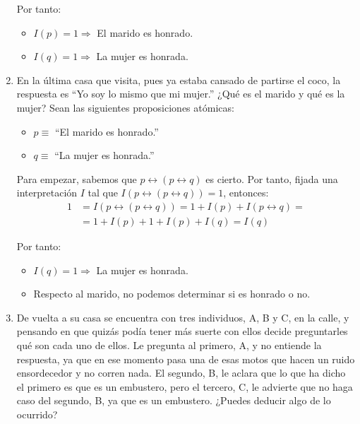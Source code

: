\begin{ejercicio}
\begin{enumerate}
        Por tanto:
        \begin{itemize}
            \item $I(p) = 1\Longrightarrow$ El marido es honrado.
            \item $I(q) = 1\Longrightarrow$ La mujer es honrada.
        \end{itemize}
        \item En la última casa que visita, pues ya estaba cansado de partirse el coco, la respuesta es ``Yo soy lo mismo que mi mujer.'' ¿Qué es el marido y qué es la mujer?
        Sean las siguientes proposiciones atómicas:
        \begin{itemize}
            \item $p\equiv$ ``El marido es honrado.''
            \item $q\equiv$ ``La mujer es honrada.''
        \end{itemize}

        Para empezar, sabemos que $p\longleftrightarrow (p\longleftrightarrow q)$ es cierto. Por tanto, fijada una interpretación $I$ tal que $I(p\longleftrightarrow (p\longleftrightarrow q))=1$, entonces:
        \begin{align*}
            1 &= I(p\longleftrightarrow (p\longleftrightarrow q))
            = 1+I(p) + I(p\longleftrightarrow q)
            =\\&= 1+I(p) + 1+I(p)+I(q)
            = I(q)
        \end{align*}

        Por tanto:
        \begin{itemize}
            \item $I(q) = 1\Longrightarrow$ La mujer es honrada.
            \item Respecto al marido, no podemos determinar si es honrado o no.
        \end{itemize}
        

        \item De vuelta a su casa se encuentra con tres individuos, A, B y C, en la calle, y pensando en que quizás podía tener más suerte con ellos decide preguntarles qué son cada uno de ellos. Le pregunta al primero, A, y no entiende la respuesta, ya que en ese momento pasa una de esas motos que hacen un ruido ensordecedor y no corren nada. El segundo, B, le aclara que lo que ha dicho el primero es que es un embustero, pero el tercero, C, le advierte que no haga caso del segundo, B, ya que es un embustero. ¿Puedes deducir algo de lo ocurrido?
        

\end{enumerate}
\end{ejercicio}
